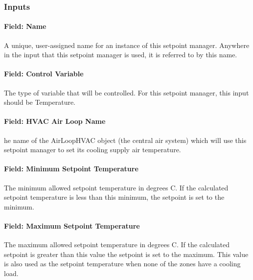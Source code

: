 \subsubsection{Inputs}\label{inputs-13-013}

\paragraph{Field: Name}\label{field-name-13-009}

A unique, user-assigned name for an instance of this setpoint manager. Anywhere in the input that this setpoint manager is used, it is referred to by this name.

\paragraph{Field: Control Variable}\label{field-control-variable-13}

The type of variable that will be controlled. For this setpoint manager, this input should be Temperature.

\paragraph{Field: HVAC Air Loop Name}\label{field-hvac-air-loop-name-3}

he name of the AirLoopHVAC object (the central air system) which will use this setpoint manager to set its cooling supply air temperature.

\paragraph{Field: Minimum Setpoint Temperature}\label{field-minimum-setpoint-temperature-3}

The minimum allowed setpoint temperature in degrees C. If the calculated setpoint temperature is less than this minimum, the setpoint is set to the minimum.

\paragraph{Field: Maximum Setpoint Temperature}\label{field-maximum-setpoint-temperature-3}

The maximum allowed setpoint temperature in degrees C. If the calculated setpoint is greater than this value the setpoint is set to the maximum. This value is also used as the setpoint temperature when none of the zones have a cooling load.

